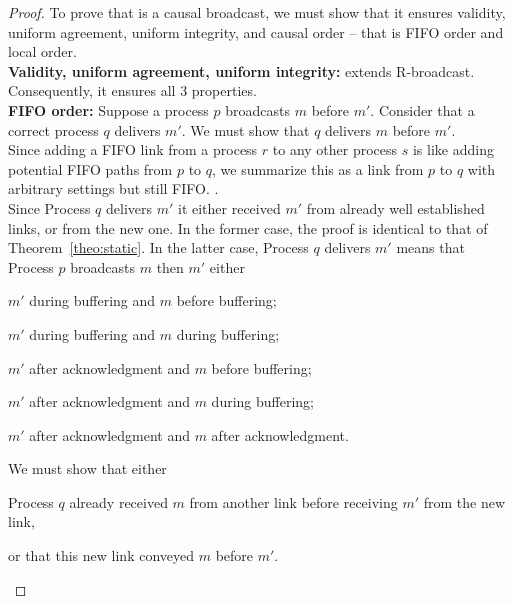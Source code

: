\begin{proof}
  To prove that \CBROADCAST is a causal broadcast, we must show that it ensures
  validity, uniform agreement, uniform integrity, and causal order -- that is
  FIFO order and local order. \\
  \textbf{Validity, uniform agreement, uniform integrity:} \CBROADCAST extends
  R-broadcast. Consequently, it ensures all 3 properties. \\
  \textbf{FIFO order:} Suppose a process $p$ broadcasts $m$ before
  $m'$. Consider that a correct process $q$ delivers $m'$. We must show that $q$
  delivers $m$ before $m'$. \\
  Since adding a FIFO link from a process $r$ to any
  other process $s$ is like adding potential FIFO paths from $p$ to $q$, we
  summarize this as a link from $p$ to $q$ with arbitrary settings but still
  FIFO.  . \\
  Since Process $q$ delivers $m'$ it either received $m'$ from already well
  established links, or from the new one. In the former case, the proof is
  identical to that of Theorem~\ref{theo:static}. In the latter case, Process
  $q$ delivers $m'$ means that Process $p$ broadcasts $m$ then $m'$ either
  \begin{inparaenum}[(i)]
  \item \label{case:one} $m'$ during buffering and $m$ before buffering;
  \item \label{case:two} $m'$ during buffering and $m$ during buffering;
  \item \label{case:three} $m'$ after acknowledgment and $m$ before buffering;
  \item \label{case:four} $m'$ after acknowledgment and $m$ during buffering;
  \item \label{case:five} $m'$ after acknowledgment and $m$ after acknowledgment.
  \end{inparaenum}
  We must show that either 
  \begin{inparaenum}[(1)]
  \item \label{show:one} Process $q$ already received $m$ from another link
    before receiving $m'$ from the new link,
  \item \label{show:two} or that this new link conveyed $m$ before $m'$.
  \end{inparaenum}


\end{proof}

